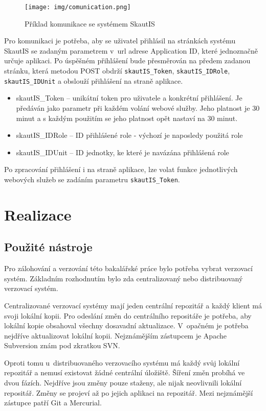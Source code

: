 \documentclass[thesis=B,czech]{FITthesis}[2011/06/14]
\begin{document}
\begin{figure}[h] \centering
 	\texttt{[image: img/comunication.png]}
 	\caption[SkautIS]{Příklad komunikace se systémem SkautIS}\label{fig:comunication-diagram}
\end{figure}

Pro komunikaci je potřeba, aby se uživatel přihlásil na stránkách systému SkautIS se zadaným parametrem v~url adrese Application ID, které jednoznačně určuje aplikaci. Po úspěšném přihlášení bude přesměrován na předem zadanou stránku, která metodou POST obdrží \texttt{skautIS\_Token}, \texttt{skautIS\_IDRole}, \texttt{skautIS\_IDUnit} a obslouží přihlášení na straně aplikace.

\begin{itemize}
	\item skautIS\_Token -- unikátní token pro uživatele a konkrétní přihlášení. Je předáván jako parametr při každém volání webové služby. Jeho platnost je 30 minut a s každým použitím se jeho platnost opět nastaví na 30 minut. 
	\item skautIS\_IDRole -- ID přihlášené role - výchozí je naposledy použitá role 
	\item skautIS\_IDUnit -- ID jednotky, ke které je navázána přihlášená role 
\end{itemize}

Po zpracování přihlášení i na straně aplikace, lze volat funkce jednotlivých webových služeb se zadáním parametru \texttt{skautIS\_Token}.

\chapter{Realizace}

\section{Použité nástroje}
Pro zálohování a verzování této bakalářské práce bylo potřeba vybrat verzovací systém. Základním rozhodnutím bylo zda centralizovaný nebo distribuovaný verzovací systém.

Centralizované verzovací systémy mají jeden centrální repozitář a každý klient má svoji lokální kopii. Pro odeslání změn do centrálního repositáře je potřeba, aby lokální kopie obsahoval všechny dosavadní aktualizace. V~opačném je potřeba nejdříve aktualizovat lokální kopii. Nejznámějším zástupcem je Apache Subversion znám pod zkratkou SVN.

Oproti tomu u~distribuovaného verzovacího systému má každý svůj lokální repozitář a nemusí existovat žádné centrální úložiště. Šíření změn probíhá ve dvou fázích. Nejdříve jsou změny pouze staženy, ale nijak neovlivnili lokální repositář. Změny se projeví až po jejich aplikaci na repozitář. Mezi nejznámější zástupce patří Git a Mercurial.
\end{document}

